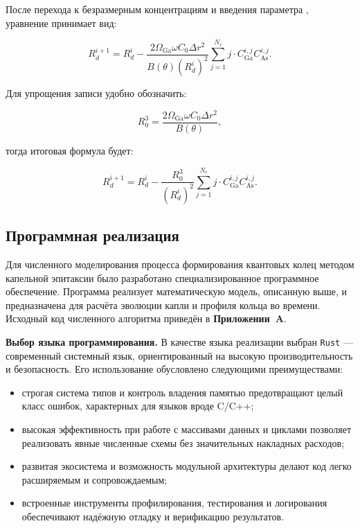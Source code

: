 \documentclass[14pt,oneside]{extarticle}
\begin{document}
После перехода к безразмерным концентрациям и введения параметра , уравнение принимает вид:

\begin{equation}
R_d^{i+1} = R_d^i - \frac{2 \Omega_{\text{Ga}} \omega C_0 \Delta r^2}{B(\theta) (R_d^i)^2} \sum_{j=1}^{N_r} j \cdot C_{\text{Ga}}^{i,j} C_{\text{As}}^{i,j}.
\end{equation}

Для упрощения записи удобно обозначить:

\begin{equation}
R_0^3 = \frac{2 \Omega_{\text{Ga}} \omega C_0 \Delta r^2}{B(\theta)},
\end{equation}

тогда итоговая формула будет:

\begin{equation}
R_d^{i+1} = R_d^i - \frac{R_0^3}{(R_d^i)^2} \sum_{j=1}^{N_r} j \cdot C_{\text{Ga}}^{i,j} C_{\text{As}}^{i,j}.
\end{equation}

\subsection{Программная реализация}

Для численного моделирования процесса формирования квантовых колец методом капельной эпитаксии было разработано специализированное программное обеспечение. Программа реализует математическую модель, описанную выше, и предназначена для расчёта эволюции капли и профиля кольца во времени. Исходный код численного алгоритма приведён в \textbf{Приложении~A}.

\textbf{Выбор языка программирования.} В качестве языка реализации выбран \texttt{Rust} — современный системный язык, ориентированный на высокую производительность и безопасность. Его использование обусловлено следующими преимуществами:

\begin{itemize}
    \item строгая система типов и контроль владения памятью предотвращают целый класс ошибок, характерных для языков вроде C/C++;
    \item высокая эффективность при работе с массивами данных и циклами позволяет реализовать явные численные схемы без значительных накладных расходов;
    \item развитая экосистема и возможность модульной архитектуры делают код легко расширяемым и сопровождаемым;
    \item встроенные инструменты профилирования, тестирования и логирования обеспечивают надёжную отладку и верификацию результатов.
\end{itemize}
\end{document}
